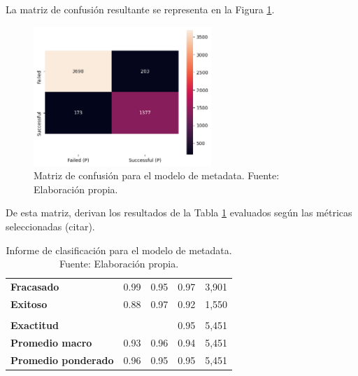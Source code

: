 La matriz de confusión resultante se representa en la Figura \ref{5:fig3}.

\begin{figure}[!ht]
	\begin{center}
		\includegraphics[width=0.60\textwidth]{4/figures/metadata_confusion_matrix.png}
		\caption{Matriz de confusión para el modelo de metadata. Fuente: Elaboración propia.}
		\label{5:fig3}
	\end{center}
\end{figure}

De esta matriz, derivan los resultados de la Tabla \ref{5:table1} evaluados según las métricas seleccionadas (citar).

\begin{table}[h!]
	\centering
	\small
	\begin{tabular}{ |m{4.5cm}|m{2.5cm}|m{2.5cm}|m{2.5cm}|m{2.5cm}|  }
		\hline
		\rowcolor{bluejean}
		\Centering \color{white}{Valor}& \Centering \color{white}{Precisión}& \Centering \color{white}{Sensibilidad}& \Centering \color{white}{Puntaje F1}& \Centering \color{white}{Muestras}\\
		\hline
		\textbf{Fracasado} & 0.99 & 0.95 & 0.97 & 3,901 \\
		\hline
		\textbf{Exitoso} & 0.88 & 0.97 & 0.92 & 1,550 \\
		\hline
		\rowcolor{turq}
		\multicolumn{5}{c}{ } \\
		\hline
		\textbf{Exactitud} &  &	 & 0.95 & 5,451 \\
		\hline
		\textbf{Promedio macro} & 0.93 & 0.96 & 0.94 & 5,451 \\
		\hline
		\textbf{Promedio ponderado} & 0.96 & 0.95 & 0.95 & 5,451 \\
		\hline
	\end{tabular}
	\caption{Informe de clasificación para el modelo de metadata. Fuente: Elaboración propia.}
	\label{5:table1}
\end{table}

